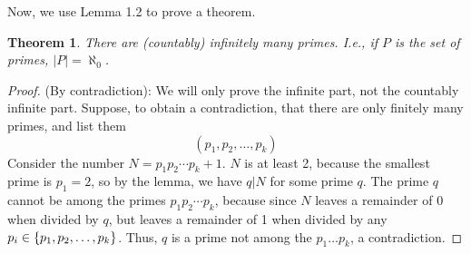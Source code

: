 \documentclass[10pt]{article}
\newtheorem{theorem}{Theorem}[section]
\theoremstyle{definition}
\begin{document}
Now, we use Lemma 1.2 to prove a theorem.  
\begin{theorem}
There are (countably) infinitely many primes.  I.e., if $P$ is the set of primes, $|P| = \aleph_0$.
\end{theorem}
\begin{proof}(By contradiction):
We will only prove the infinite part, not the countably infinite part.  Suppose, to obtain a contradiction, that there are only finitely many primes, and list them 
\[(p_1,p_2,\dots,p_k)\]
Consider the number $N=p_1 p_2\cdots p_k+1$. $N$ is at least 2, because the smallest prime is $p_1=2$, so by the lemma, we have $q|N$ for some prime $q$.  The prime $q$ cannot be among the primes $p_1p_2\cdots p_k$, because since $N$ leaves a remainder of 0 when divided by $q$, but leaves a remainder of 1 when divided by any $p_i \in \{ p_1,p_2,\ldots,p_k \}
$.  Thus, $q$ is a prime not among the $p_1\ldots p_k$, a contradiction.  \end{proof}
\end{document}
